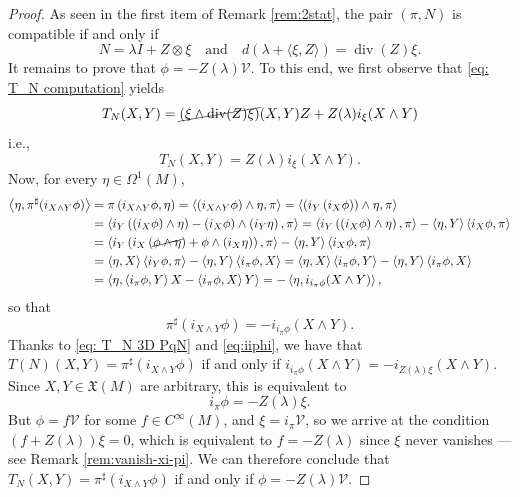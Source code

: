 \documentclass[12pt]{article}
\begin{document}
\begin{proof} As seen in the first item of Remark \ref{rem:2stat}, 
the pair $(\pi,N)$ is compatible if and only if
\[
N=\lambda I+Z\otimes\xi\quad\text{and}\quad d(\lambda+\langle\xi,Z\rangle)=\operatorname{div}(Z)\xi.
\]
It remains to prove that $\phi=-Z(\lambda)\mathcal V$. To this end, we first observe that \eqref{eq: T_N computation} yields 
\begin{equation*}
T_N(X,Y)=\cancel{\left(\xi\wedge \operatorname{div}(Z)\xi\right)}(X,Y)Z+Z(\lambda)i_{\xi}(X\wedge Y)
\end{equation*}
i.e.,
\begin{equation}
T_N(X,Y)=Z(\lambda)i_\xi(X\wedge Y).\label{eq: T_N 3D PqN}
\end{equation}
Now, for every $\eta\in\Omega^1(M)$, 
\begin{align*}
\left<\eta,\pi^{\sharp}(i_{X\wedge Y}\phi)\right>&=\pi\left(i_{X\wedge Y}\phi,\eta\right)=\left<\left(i_{X\wedge Y}\phi\right)\wedge \eta,\pi\right>
=\left<\left(i_Y\left(i_X\phi\right)\right)\wedge\eta,\pi\right>\\
&=
\left<i_Y\left(\left(i_X\phi\right)\wedge\eta\right)-\left(i_X\phi\right)\wedge \left(i_Y\eta\right),\pi\right>
=\left<i_Y\left(\left(i_X\phi\right)\wedge\eta\right),\pi\right>-\left<\eta,Y\right>\left<i_X\phi,\pi\right>
\\
&=\left<i_Y\left(i_X\left(\cancel{\phi\wedge\eta}\right)+\phi\wedge\left(i_X\eta\right)\right),\pi\right>-\left<\eta,Y\right>\left<i_X\phi,\pi\right>\\
&=\left<\eta,X\right>\left<i_Y\phi,\pi\right>-\left<\eta,Y\right>\left<i_{\pi}\phi,X\right>=\left<\eta,X\right>\left<i_{\pi}\phi,Y\right>-\left<\eta,Y\right>\left<i_{\pi}\phi,X\right>\\
&=\left<\eta,\left<i_{\pi}\phi,Y\right>X-\left<i_{\pi}\phi,X\right>Y\right>
=-\left<\eta,i_{i_{\pi}\phi}(X\wedge Y)\right>,
\end{align*}
so that 
\begin{equation}
\label{eq:iiphi}
\pi^{\sharp}(i_{X\wedge Y}\phi)=-i_{i_{\pi}\phi}(X\wedge Y).
\end{equation}
Thanks to \eqref{eq: T_N 3D PqN} and \eqref{eq:iiphi}, we have that $T(N)(X,Y)=\pi^{\sharp}(i_{X\wedge Y}\phi)$ 
if and only if $i_{i_{\pi}\phi}(X\wedge Y)=-i_{Z(\lambda)\xi}(X\wedge Y)$. Since $X,Y\in\mathfrak X(M)$ are arbitrary, this is equivalent to 
$$i_{\pi}\phi=-Z(\lambda)\xi.$$ But $\phi=f\mathcal V$ for some $f\in C^\infty(M)$, and 
$\xi=i_\pi\mathcal V$, so we arrive at the condition $(f+Z(\lambda))\xi=0$, which is equivalent to $f=-Z(\lambda)$ since $\xi$ never vanishes --- see Remark \ref{rem:vanish-xi-pi}.
We can therefore conclude that $T_N(X,Y)=\pi^{\sharp}(i_{X\wedge Y}\phi)$ if and only if $\phi=-Z(\lambda)\mathcal V$.
\end{proof}
\end{document}

